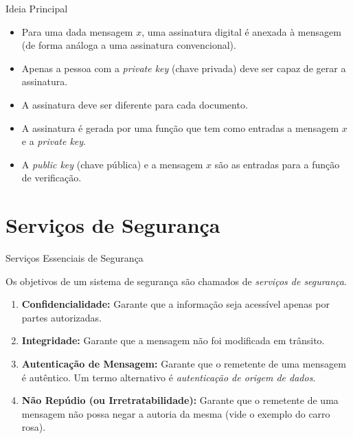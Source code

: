 \documentclass{beamer}
\begin{document}
\begin{frame}{Ideia Principal}
    \begin{itemize}
        \item Para uma dada mensagem $x$, uma assinatura digital é anexada à mensagem (de forma análoga a uma assinatura convencional).
        \item Apenas a pessoa com a \textit{private key} (chave privada) deve ser capaz de gerar a assinatura.
        \item A assinatura deve ser diferente para cada documento.
    \end{itemize}

    \vspace{1em}

    \begin{itemize}
        \item[$\Rightarrow$] A assinatura é gerada por uma função que tem como entradas a mensagem $x$ e a \textit{private key}.
        \item[$\Rightarrow$] A \textit{public key} (chave pública) e a mensagem $x$ são as entradas para a função de verificação.
    \end{itemize}
\end{frame}


\section{Serviços de Segurança}

\begin{frame}{Serviços Essenciais de Segurança}
    
    \begin{alertblock}{}
        Os objetivos de um sistema de segurança são chamados de \textit{serviços de segurança}.
    \end{alertblock}

    \vspace{1em}

    \begin{enumerate}
        \item<+-> \textbf{Confidencialidade:} Garante que a informação seja acessível apenas por partes autorizadas.
        
        \item<+-> \textbf{Integridade:} Garante que a mensagem não foi modificada em trânsito.
        
        \item<+-> \textbf{Autenticação de Mensagem:} Garante que o remetente de uma mensagem é autêntico. Um termo alternativo é \textit{autenticação de origem de dados}.
        
        \item<+-> \textbf{Não Repúdio (ou Irretratabilidade):} Garante que o remetente de uma mensagem não possa negar a autoria da mesma (vide o exemplo do carro rosa).
    \end{enumerate}

\end{frame}
\end{document}

